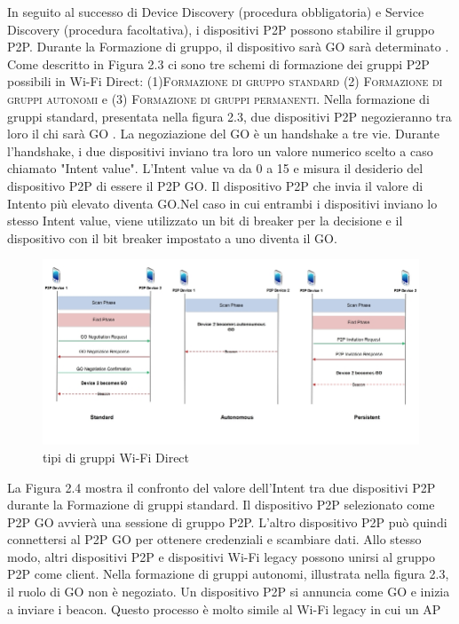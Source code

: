 In seguito al successo di Device Discovery (procedura obbligatoria) e
Service Discovery (procedura facoltativa), i dispositivi P2P  possono
stabilire il gruppo P2P. Durante la Formazione di gruppo, il dispositivo
sarà GO sarà determinato . Come descritto in Figura 2.3 ci sono
tre schemi di formazione dei gruppi P2P possibili in
Wi-Fi Direct: (1)\textsc{Formazione di gruppo standard} (2) \textsc{Formazione di
gruppi autonomi} e (3) \textsc{Formazione di gruppi permanenti}. Nella formazione
di gruppi standard, presentata nella figura 2.3,  due dispositivi P2P
negozieranno
tra loro il chi sarà GO . La negoziazione del GO è un handshake a
tre vie. Durante l'handshake, i due dispositivi inviano tra loro un valore
numerico scelto a caso chiamato "Intent value". L'Intent value
va da 0 a 15 e misura il desiderio del dispositivo P2P di essere il P2P
GO. Il dispositivo P2P che invia il valore di Intento più elevato
diventa GO.Nel caso in cui entrambi i dispositivi inviano
lo stesso Intent value, viene utilizzato
un bit di breaker per la decisione e il dispositivo con il bit breaker  
impostato a uno diventa il GO.
\begin{figure}
\caption{tipi di gruppi Wi-Fi Direct}
\includegraphics[width=1\columnwidth]{imgs/wifiGroup.jpg} %
\end{figure}
La Figura 2.4 mostra il confronto del valore
dell'Intent tra due dispositivi P2P durante la Formazione di gruppi
standard. Il dispositivo P2P selezionato come P2P GO avvierà una
sessione di gruppo P2P. L'altro dispositivo P2P può quindi
connettersi al P2P GO per ottenere credenziali e scambiare
dati. Allo stesso modo, altri dispositivi P2P e dispositivi
Wi-Fi legacy possono unirsi al gruppo P2P come client. Nella
formazione di gruppi autonomi, illustrata nella figura 2.3,
il ruolo di GO non è negoziato. Un dispositivo P2P
si annuncia come GO e inizia a inviare i beacon. Questo
processo è molto simile al Wi-Fi legacy in cui un AP
